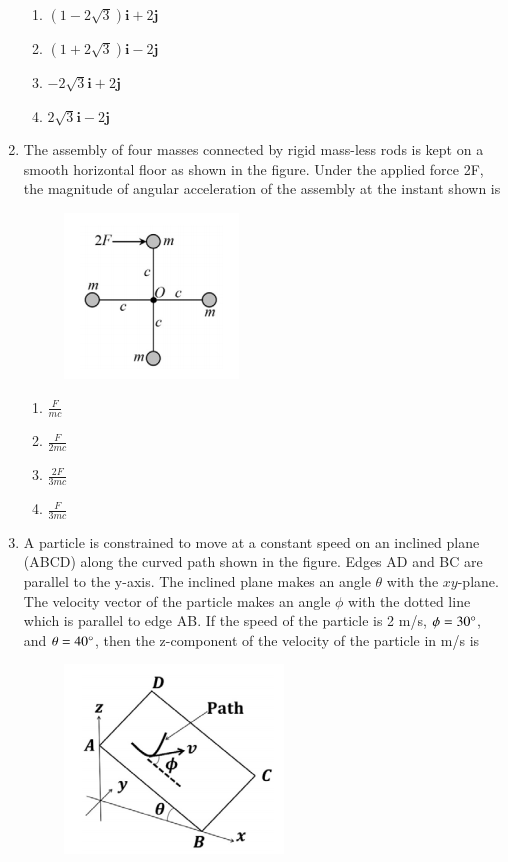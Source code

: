 \documentclass[a4paper,10pt]{article}
\begin{document}
\begin{enumerate}
\hfill{}
\begin{enumerate}
    \item $(1-2\sqrt{3})\mathbf{i} + 2\mathbf{j}$
    \item $(1+2\sqrt{3})\mathbf{i} - 2\mathbf{j}$
    \item $-2\sqrt{3}\mathbf{i} + 2\mathbf{j}$
    \item $2\sqrt{3}\mathbf{i} - 2\mathbf{j}$
\end{enumerate}

\item The assembly of four masses connected by rigid mass-less rods is kept on a smooth horizontal floor as shown in the figure. Under the applied force 2F, the magnitude of angular acceleration of the assembly at the instant shown is
\begin{figure}[H]
    \centering
    \includegraphics[width=0.3\columnwidth]{q71.png}
    \caption*{}
    \label{fig:q71}
\end{figure}

\hfill{}
\begin{enumerate}
    \item $\frac{F}{mc}$
    \item $\frac{F}{2mc}$
    \item $\frac{2F}{3mc}$
    \item $\frac{F}{3mc}$
\end{enumerate}

\item A particle is constrained to move at a constant speed on an inclined plane (ABCD) along the curved path shown in the figure. Edges AD and BC are parallel to the y-axis. The inclined plane makes an angle $\theta$ with the $xy$-plane. The velocity vector of the particle makes an angle $\phi$ with the dotted line which is parallel to edge AB. If the speed of the particle is 2 m/s, $\phi=30\degree$, and $\theta=40\degree$, then the z-component of the velocity of the particle in m/s is \underline{\hspace{2cm}}
\begin{figure}[H]
    \centering
    \includegraphics[width=0.4\columnwidth]{q72.png}
    \caption*{}
    \label{fig:q72}
\end{figure}


\end{enumerate}
\end{document}
